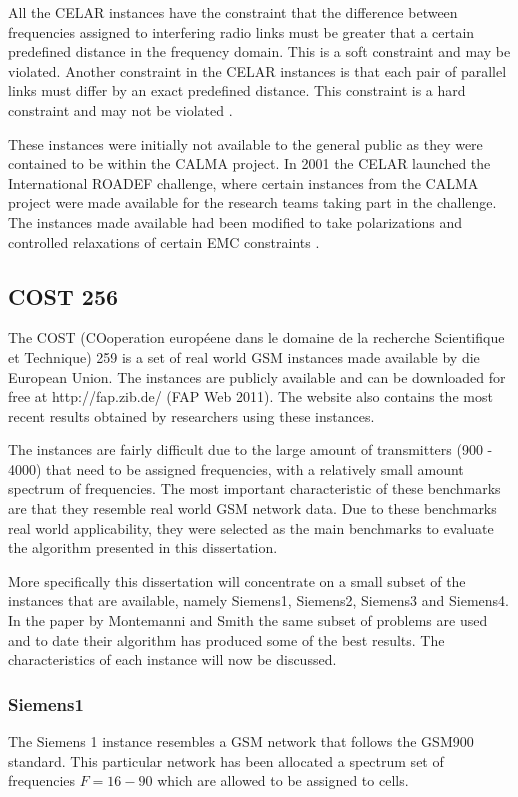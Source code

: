 All the CELAR instances have the constraint that the difference between frequencies assigned to interfering radio links must be greater that a certain predefined distance in the frequency domain. This is a soft constraint and may be violated. Another constraint in the CELAR instances is that each pair of parallel links must differ by an exact predefined distance. This constraint is a hard constraint and may not be violated \cite{DynamicFAP}.

These instances were initially not available to the general public as they were contained to be within the CALMA project. In 2001 the CELAR launched the International ROADEF challenge, where certain instances from the CALMA project were made available for the research teams taking part in the challenge. The instances made available had been modified to take polarizations and controlled relaxations of certain EMC constraints \cite{LowerPolarFAP}.
\subsection{COST 256}
\label{sec:COST259}
The COST (COoperation européene dans le domaine de la recherche Scientifique et Technique) 259 is a set of real world GSM instances made available by die European Union. The instances are publicly available and can  be downloaded for free at http://fap.zib.de/ (FAP Web 2011). The website also contains the most recent results obtained by researchers using these instances\cite{Karen2004,Eisenblatter}.

The instances are fairly difficult due to the large amount of transmitters (900 - 4000) that need to be assigned frequencies, with a relatively small amount spectrum of frequencies. The most important characteristic of these benchmarks are that they resemble real world GSM network data. Due to these benchmarks real world applicability, they were selected as the main benchmarks to evaluate the algorithm presented in this dissertation.

More specifically this dissertation will concentrate on a small subset of the instances that are available, namely Siemens1, Siemens2, Siemens3 and Siemens4. In the paper by Montemanni and Smith \cite{TabuMontemanniSmith} the same subset of problems are used and to date their algorithm has produced some of the best results. The characteristics of each instance will now be discussed.
\subsubsection{Siemens1}
The Siemens 1 instance resembles a GSM network that follows the GSM900 standard. This particular network has been allocated a spectrum set of frequencies $F = {16-90}$ which are allowed to be assigned to cells. 

